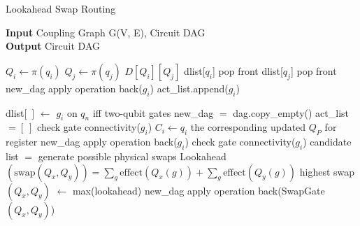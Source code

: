 \begin{algorithm}[htbp]
\caption{Lookahead Swap Routing}\label{alg:lookahead-swap-routing}
\hspace*{\algorithmicindent} \textbf{Input} Coupling Graph G(V, E), Circuit DAG \\
\hspace*{\algorithmicindent} \textbf{Output} Circuit DAG
\begin{algorithmic}[1]

    \State $Q_i \gets \pi(q_i)$
    \State $Q_j \gets \pi(q_j)$
    \State $D[Q_i][Q_j]$
        \State dlist[$q_i$] pop front
        \State dlist[$q_j$] pop front
        \State new\_dag apply operation back($g_i$)
    \Else
        \State act\_list.append($g_i$)
    \EndIf
\EndProcedure

\item[]

\State dlist[\ ] $\gets$ $g_i$ on $q_n$ iff two-qubit gates
\State new\_dag $=$ dag.copy\_empty()
\State act\_list $= [\ ]$
 
            \State check gate connectivity($g_i$)
        \Else
                \State $C_i \gets q_i$ the corresponding updated $Q_P$ for register
            \EndIf
            \State new\_dag apply operation back($g_i$)    
        \EndIf
    \EndFor
        \State check gate connectivity($g_i$)
        \State candidate list $=$ generate possible physical swaps
            \State Lookahead $(\text{swap}(Q_x, Q_y)) = \sum_{g} \text{effect}(Q_x(g)) + \sum_{g} \text{effect}(Q_y(g))$
        \EndFor
        \State highest swap $(Q_x, Q_y)$ $\gets$ max(lookahead)
        \State new\_dag apply operation back(SwapGate$(Q_x, Q_y)$)
    \EndWhile
\EndFor
\end{algorithmic}
\end{algorithm}

